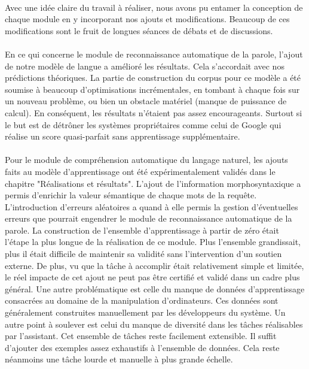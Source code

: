 \paragraph{}
Avec une idée claire du travail à réaliser, nous avons pu entamer la conception de chaque module en y incorporant nos ajouts et modifications. Beaucoup de ces modifications sont le fruit de longues séances de débats et de discussions. 

\paragraph{}
En ce qui concerne le module de reconnaissance automatique de la parole, l'ajout de notre modèle de langue a amélioré les résultats. Cela s'accordait avec nos prédictions théoriques. La partie de construction du corpus pour ce modèle a été soumise à beaucoup d'optimisations incrémentales, en tombant à chaque fois sur un nouveau problème, ou bien un obstacle matériel (manque de puissance de calcul). En conséquent, les résultats n'étaient pas assez encourageants. Surtout si le but est de détrôner les systèmes propriétaires comme celui de Google qui réalise un score quasi-parfait sans apprentissage supplémentaire.

\paragraph{}


Pour le module de compréhension automatique du langage naturel, les ajouts faits au modèle d'apprentissage ont été expérimentalement validés dans le chapitre "Réalisations et résultats". L'ajout de l'information morphosyntaxique a permis d'enrichir la valeur sémantique de chaque mots de la requête. L'introduction d'erreurs aléatoires a quand à elle permis la gestion d'éventuelles erreurs que pourrait engendrer le module de reconnaissance automatique de la parole. La construction de l'ensemble d'apprentissage à partir de zéro était l'étape la plus longue de la réalisation de ce module. Plus l'ensemble grandissait, plus il était difficile de maintenir sa validité sans l'intervention d'un soutien externe. De plus, vu que la tâche à accomplir était relativement simple et limitée, le réel impacte de cet ajout ne peut pas être certifié et validé dans un cadre plus général. Une autre problématique est celle du manque de données d'apprentissage consacrées au domaine de la manipulation d'ordinateurs. Ces données sont généralement construites manuellement par les développeurs du système. Un autre point à soulever est celui du manque de diversité dans les tâches réalisables par l'assistant. Cet ensemble de tâches reste facilement extensible. Il suffit d'ajouter des exemples assez exhaustifs à l'ensemble de données. Cela reste néanmoins une tâche lourde et manuelle à plus grande échelle.

